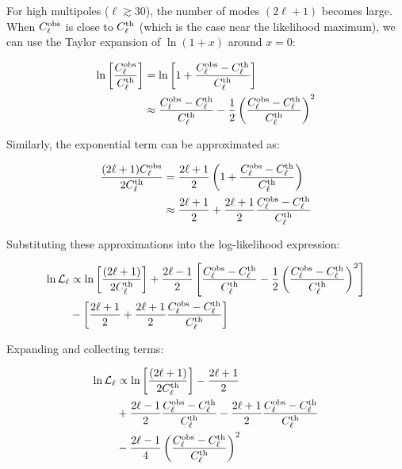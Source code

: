 \documentclass[11pt]{article}
\theoremstyle{definition}
\begin{document}
For high multipoles ($\ell \gtrsim 30$), the number of modes $(2\ell+1)$ becomes large. When $C_\ell^{\rm obs}$ is close to $C_\ell^{\rm th}$ (which is the case near the likelihood maximum), we can use the Taylor expansion of $\ln(1+x)$ around $x=0$:

\begin{align}
\ln\left[\frac{C_\ell^{\rm obs}}{C_\ell^{\rm th}}\right] &= \ln\left[1 + \frac{C_\ell^{\rm obs} - C_\ell^{\rm th}}{C_\ell^{\rm th}}\right] \\
&\approx \frac{C_\ell^{\rm obs} - C_\ell^{\rm th}}{C_\ell^{\rm th}} - \frac{1}{2}\left(\frac{C_\ell^{\rm obs} - C_\ell^{\rm th}}{C_\ell^{\rm th}}\right)^2
\end{align}

Similarly, the exponential term can be approximated as:

\begin{align}
\frac{(2\ell+1)C_\ell^{\rm obs}}{2C_\ell^{\rm th}} &= \frac{2\ell+1}{2}\left(1 + \frac{C_\ell^{\rm obs} - C_\ell^{\rm th}}{C_\ell^{\rm th}}\right) \\
&\approx \frac{2\ell+1}{2} + \frac{2\ell+1}{2}\frac{C_\ell^{\rm obs} - C_\ell^{\rm th}}{C_\ell^{\rm th}}
\end{align}

Substituting these approximations into the log-likelihood expression:

\begin{align}
\ln\mathcal{L}_\ell &\propto \ln\left[\frac{(2\ell+1)}{2C_\ell^{\rm th}}\right] + \frac{2\ell-1}{2}\left[\frac{C_\ell^{\rm obs} - C_\ell^{\rm th}}{C_\ell^{\rm th}} - \frac{1}{2}\left(\frac{C_\ell^{\rm obs} - C_\ell^{\rm th}}{C_\ell^{\rm th}}\right)^2\right] \\
&- \left[\frac{2\ell+1}{2} + \frac{2\ell+1}{2}\frac{C_\ell^{\rm obs} - C_\ell^{\rm th}}{C_\ell^{\rm th}}\right]
\end{align}

Expanding and collecting terms:

\begin{align}
\ln\mathcal{L}_\ell &\propto \ln\left[\frac{(2\ell+1)}{2C_\ell^{\rm th}}\right] - \frac{2\ell+1}{2} \\
&+ \frac{2\ell-1}{2}\frac{C_\ell^{\rm obs} - C_\ell^{\rm th}}{C_\ell^{\rm th}} - \frac{2\ell+1}{2}\frac{C_\ell^{\rm obs} - C_\ell^{\rm th}}{C_\ell^{\rm th}} \\
&- \frac{2\ell-1}{4}\left(\frac{C_\ell^{\rm obs} - C_\ell^{\rm th}}{C_\ell^{\rm th}}\right)^2
\end{align}
\end{document}
